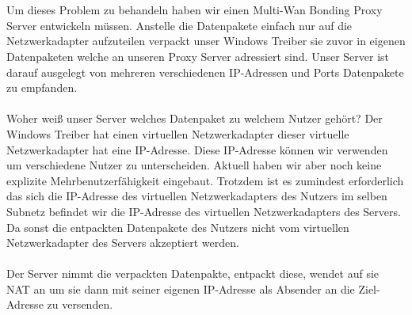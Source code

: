 \\\\
Um dieses Problem zu behandeln haben wir einen Multi-Wan Bonding Proxy Server entwickeln müssen. Anstelle die Datenpakete einfach nur auf die Netzwerkadapter aufzuteilen verpackt unser Windows Treiber sie zuvor in eigenen Datenpaketen welche an unseren Proxy Server adressiert sind. Unser Server ist darauf ausgelegt von mehreren verschiedenen IP-Adressen und Ports Datenpakete zu empfanden. 
\\\\
Woher weiß unser Server welches Datenpaket zu welchem Nutzer gehört? Der Windows Treiber hat einen virtuellen Netzwerkadapter dieser virtuelle Netzwerkadapter hat eine IP-Adresse. Diese IP-Adresse können wir verwenden um verschiedene Nutzer zu unterscheiden. Aktuell haben wir aber noch keine explizite Mehrbenutzerfähigkeit eingebaut. Trotzdem ist es zumindest erforderlich das sich die IP-Adresse des virtuellen Netzwerkadapters des Nutzers im selben Subnetz befindet wir die IP-Adresse des virtuellen Netzwerkadapters des Servers. Da sonst die entpackten Datenpakete des Nutzers nicht vom virtuellen Netzwerkadapter des Servers akzeptiert werden.
\\\\
Der Server nimmt die verpackten Datenpakte, entpackt diese, wendet auf sie NAT an um sie  dann mit seiner eigenen IP-Adresse als Absender an die Ziel-Adresse zu versenden.

